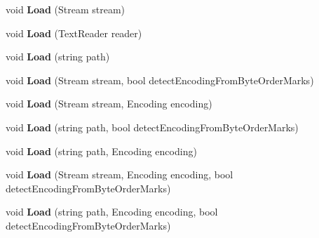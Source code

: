 \begin{DoxyCompactItemize}
void {\bfseries Load} (Stream stream)
\item 
\mbox{\label{class_html_agility_pack_1_1_html_document_a54aea4a96c18e6b345fc661d998fbddd}} 
void {\bfseries Load} (Text\+Reader reader)
\item 
\mbox{\label{class_html_agility_pack_1_1_html_document_a206d7e6b554ac1d08bfc83609db66716}} 
void {\bfseries Load} (string path)
\item 
\mbox{\label{class_html_agility_pack_1_1_html_document_a36fde208dfaee7e0cc75a3ea8ec48689}} 
void {\bfseries Load} (Stream stream, bool detect\+Encoding\+From\+Byte\+Order\+Marks)
\item 
\mbox{\label{class_html_agility_pack_1_1_html_document_aea2fcb410174b92f6671d8a5a02ff07d}} 
void {\bfseries Load} (Stream stream, Encoding encoding)
\item 
\mbox{\label{class_html_agility_pack_1_1_html_document_a9eb27328fa78b622b0945e15cfd8b640}} 
void {\bfseries Load} (string path, bool detect\+Encoding\+From\+Byte\+Order\+Marks)
\item 
\mbox{\label{class_html_agility_pack_1_1_html_document_a9071a8a3f0ce5df5749e2aa8f6e17508}} 
void {\bfseries Load} (string path, Encoding encoding)
\item 
\mbox{\label{class_html_agility_pack_1_1_html_document_ab9640d6c2f1756965237cee712b89461}} 
void {\bfseries Load} (Stream stream, Encoding encoding, bool detect\+Encoding\+From\+Byte\+Order\+Marks)
\item 
\mbox{\label{class_html_agility_pack_1_1_html_document_ad4c7edeec9a99cd1f57cc8c0ae7889a6}} 
void {\bfseries Load} (string path, Encoding encoding, bool detect\+Encoding\+From\+Byte\+Order\+Marks)
\item 
\mbox{\label{class_html_agility_pack_1_1_html_document_a6de59c92aa60dfe6f6561e8860f15996}} 

\end{DoxyCompactItemize}
